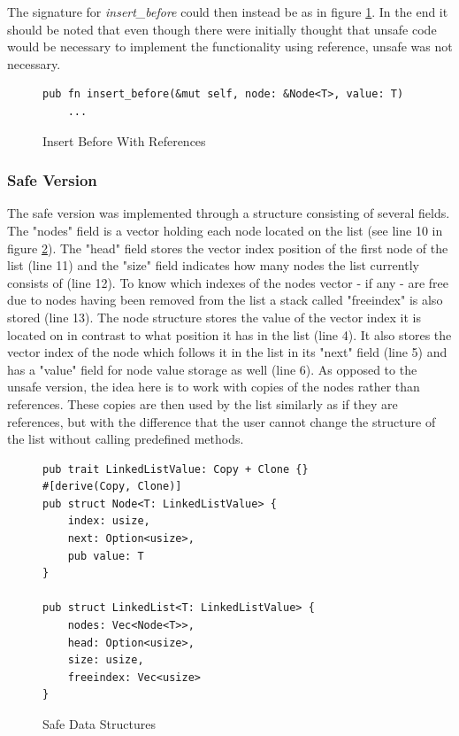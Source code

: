 The signature for \textit{insert\_before} could then instead be as in figure \ref{fig:insertbeforesignature}. In the end it should be noted that even though there were initially thought that unsafe code would be necessary to implement the functionality using reference, unsafe was not necessary.

\begin{figure}[H]
 \vspace{12pt}
\begin{lstlisting}[style=RUSTSTYLE]
    pub fn insert_before(&mut self, node: &Node<T>, value: T)
    ...
\end{lstlisting}
    \caption{Insert Before With References}
    \label{fig:insertbeforesignature}
\end{figure}


\subsubsection{Safe Version}

The safe version was implemented through a structure consisting of several fields. The "nodes" field is a vector holding each node located on the list (see line 10 in figure \ref{fig:safestructures}). The "head" field stores the vector index position of the first node of the list (line 11) and the "size" field indicates how many nodes the list currently consists of (line 12). To know which indexes of the nodes vector - if any - are free due to nodes having been removed from the list a stack called "freeindex" is also stored (line 13). The node structure stores the value of the vector index it is located on in contrast to what position it has in the list (line 4). It also stores the vector index of the node which follows it in the list in its "next" field (line 5) and has a "value" field for node value storage as well (line 6). As opposed to the unsafe version, the idea here is to work with copies of the nodes rather than references. These copies are then used by the list similarly as if they are references, but with the difference that the user cannot change the structure of the list without calling predefined methods.

\begin{figure}[H]
 \vspace{12pt}
\begin{lstlisting}[style=RUSTSTYLE]
pub trait LinkedListValue: Copy + Clone {}
#[derive(Copy, Clone)]
pub struct Node<T: LinkedListValue> {
    index: usize, 
    next: Option<usize>,
    pub value: T
}

pub struct LinkedList<T: LinkedListValue> {
    nodes: Vec<Node<T>>,
    head: Option<usize>,
    size: usize,
    freeindex: Vec<usize>
}
\end{lstlisting}
    \caption{Safe Data Structures}
    \label{fig:safestructures}
\end{figure}

